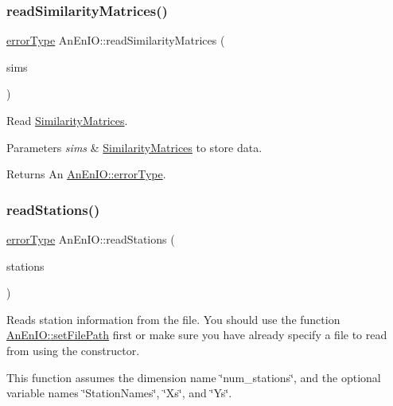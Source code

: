 \subsubsection{\texorpdfstring{read\+Similarity\+Matrices()}{readSimilarityMatrices()}}
{\footnotesize\ttfamily \mbox{\hyperlink{class_an_en_i_o_aa56bc1ec6610b86db4349bce20f9ead0}{error\+Type}} An\+En\+I\+O\+::read\+Similarity\+Matrices (\begin{DoxyParamCaption}\item[{\mbox{\hyperlink{class_similarity_matrices}{Similarity\+Matrices}} \&}]{sims }\end{DoxyParamCaption})}

Read \mbox{\hyperlink{class_similarity_matrices}{Similarity\+Matrices}}. 
\begin{DoxyParams}{Parameters}
{\em sims} & \mbox{\hyperlink{class_similarity_matrices}{Similarity\+Matrices}} to store data. \\
\hline
\end{DoxyParams}
\begin{DoxyReturn}{Returns}
An \mbox{\hyperlink{class_an_en_i_o_aa56bc1ec6610b86db4349bce20f9ead0}{An\+En\+I\+O\+::error\+Type}}. 
\end{DoxyReturn}
\mbox{\label{class_an_en_i_o_aaec8b46a52f3d8ab904fd4229bd3b9e9}} 
\subsubsection{\texorpdfstring{read\+Stations()}{readStations()}\hspace{0.1cm}{\footnotesize\ttfamily [1/2]}}
{\footnotesize\ttfamily \mbox{\hyperlink{class_an_en_i_o_aa56bc1ec6610b86db4349bce20f9ead0}{error\+Type}} An\+En\+I\+O\+::read\+Stations (\begin{DoxyParamCaption}\item[{\mbox{\hyperlink{classanen_sta_1_1_stations}{anen\+Sta\+::\+Stations}} \&}]{stations }\end{DoxyParamCaption})}

Reads station information from the file. You should use the function \mbox{\hyperlink{class_an_en_i_o_a98066d375cc78694fda2af1ce37cc8d8}{An\+En\+I\+O\+::set\+File\+Path}} first or make sure you have already specify a file to read from using the constructor.

This function assumes the dimension name \char`\"{}num\+\_\+stations\char`\"{}, and the optional variable names \char`\"{}\+Station\+Names\char`\"{}, \char`\"{}\+Xs\char`\"{}, and \char`\"{}\+Ys\char`\"{}.


